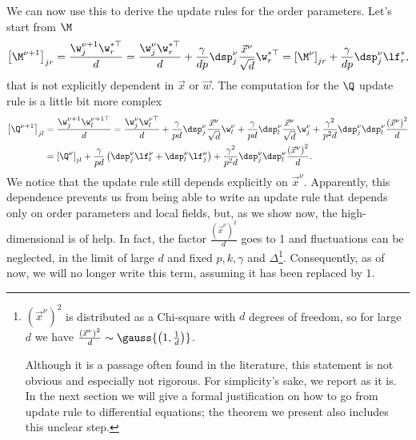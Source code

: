 We can now use this to derive the update rules for the order parameters.
Let's start from \(\M\)
\begin{equation} \label{eq:update_rule_M}
  \left[\M^{\nu+1}\right]_{jr} = \frac{\w^{\nu+1}_j \w^{*\top}_r}{d}
    = \frac{\w^{\nu}_j \w^{*\top}_r}{d} + \frac{\gamma}{dp} \dsp^\nu_j \frac{\vec{x}^\nu}{\sqrt{d}}\w^{*\top}_r
    = \left[\M^{\nu}\right]_{jr} + \frac{\gamma}{dp} \dsp^\nu_j \lf_r^*,
\end{equation}
that is not explicitly dependent in \(\vec{x}\) or \(\vec{w}\). The computation
for the \(\Q\) update rule is a little bit more complex
\begin{equation}\label{eq:update_rule_Q}\begin{split}
  \left[\Q^{\nu+1}\right]_{jl} &= \frac{\w^{\nu+1}_j \w^{\nu+1\top}_l}{d}
    = \frac{\w^{\nu}_j \w^{\nu\top}_l}{d} + \frac{\gamma}{pd} \dsp^\nu_j \frac{\vec{x}^\nu}{\sqrt{d}}\w_l^\nu
      + \frac{\gamma}{pd} \dsp^\nu_l \frac{\vec{x}^\nu}{\sqrt{d}}\w_j^\nu 
      + \frac{\gamma^2}{p^2d} \dsp^\nu_j\dsp^\nu_l \frac{\left(\vec{x}^\nu\right)^2}{d}\\
    &= \left[\Q^{\nu}\right]_{jl} + \frac{\gamma}{pd}\left(\dsp^\nu_j \lf_l^\nu + \dsp^\nu_l \lf_j^\nu\right)
    + \frac{\gamma^2}{p^2d} \dsp^\nu_j\dsp^\nu_l \frac{\left(\vec{x}^\nu\right)^2}{d}.
\end{split}\end{equation}
We notice that the update rule still depends explicitly on \(\vec{x}^\nu\).
Apparently, this dependence prevents us from being able to write an update rule
that depends only on order parameters and local fields, but, as we show now, the 
high-dimensional is of help.
In fact, the factor \(\frac{\left(\vec{x}^\nu\right)^2}{d}\) goes to 1 and 
fluctuations can be neglected, in the limit of large \(d\) and fixed \(p,k,\gamma\) and \(\Delta\)\footnote{
  \(\left(\vec{x}^\nu\right)^2\) is distributed as a Chi-square with \(d\) degrees
  of freedom, so for large \(d\) we have 
  \(\frac{\left(\vec{x}^\nu\right)^2}{d} \sim \gauss{\left(1,\frac1d\right)}\).

  Although it is a passage often found in the literature,
  this statement is not obvious and especially not rigorous.
  For simplicity's sake, we report as it is.
  In the next section we will give a formal justification on how to go from update rule
  to differential equations; the theorem we present also includes this unclear step.
}. Consequently, as of now, we will no longer write this term, assuming it has been replaced by 1.

